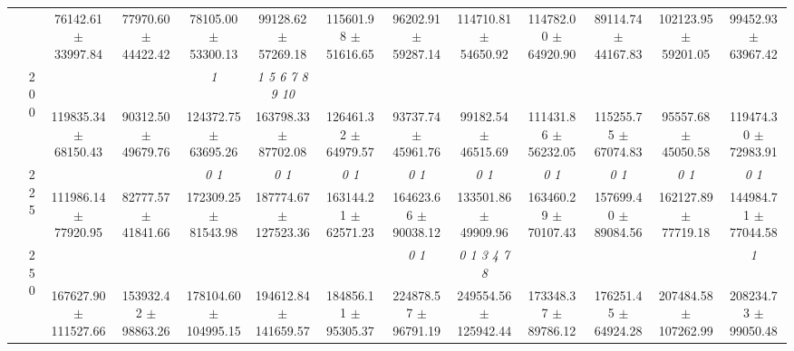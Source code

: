 \begin{table}[h]
{\begin{tabular}{
        ccccccccccccc}
 & & \cellcolor[HTML]{EFEFEF} 76142.61 $\pm$ 33997.84& \cellcolor[HTML]{EFEFEF} 77970.60 $\pm$ 44422.42& \cellcolor[HTML]{EFEFEF} 78105.00 $\pm$ 53300.13& \cellcolor[HTML]{EFEFEF} 99128.62 $\pm$ 57269.18& \cellcolor[HTML]{EFEFEF} 115601.98 $\pm$ 51616.65& \cellcolor[HTML]{EFEFEF} 96202.91 $\pm$ 59287.14& \cellcolor[HTML]{EFEFEF} 114710.81 $\pm$ 54650.92& \cellcolor[HTML]{EFEFEF} 114782.00 $\pm$ 64920.90& \cellcolor[HTML]{EFEFEF} 89114.74 $\pm$ 44167.83& \cellcolor[HTML]{EFEFEF} 102123.95 $\pm$ 59201.05& \cellcolor[HTML]{EFEFEF} 99452.93 $\pm$ 63967.42 \\ 
 & \multirow{2}{*}{200}& & & \textit{ 1 }& \textit{  1  5  6  7  8  9 10 }& & & & & & &  \\ 
 & & 119835.34 $\pm$ 68150.43& 90312.50 $\pm$ 49679.76& 124372.75 $\pm$ 63695.26& 163798.33 $\pm$ 87702.08& 126461.32 $\pm$ 64979.57& 93737.74 $\pm$ 45961.76& 99182.54 $\pm$ 46515.69& 111431.86 $\pm$ 56232.05& 115255.75 $\pm$ 67074.83& 95557.68 $\pm$ 45050.58& 119474.30 $\pm$ 72983.91 \\ 
 & \multirow{2}{*}{225}& \cellcolor[HTML]{EFEFEF} & \cellcolor[HTML]{EFEFEF} & \cellcolor[HTML]{EFEFEF} \textit{ 0 1 }& \cellcolor[HTML]{EFEFEF} \textit{ 0 1 }& \cellcolor[HTML]{EFEFEF} \textit{ 0 1 }& \cellcolor[HTML]{EFEFEF} \textit{ 0 1 }& \cellcolor[HTML]{EFEFEF} \textit{ 0 1 }& \cellcolor[HTML]{EFEFEF} \textit{ 0 1 }& \cellcolor[HTML]{EFEFEF} \textit{ 0 1 }& \cellcolor[HTML]{EFEFEF} \textit{ 0 1 }& \cellcolor[HTML]{EFEFEF} \textit{ 0 1 } \\ 
 & & \cellcolor[HTML]{EFEFEF} 111986.14 $\pm$ 77920.95& \cellcolor[HTML]{EFEFEF} 82777.57 $\pm$ 41841.66& \cellcolor[HTML]{EFEFEF} 172309.25 $\pm$ 81543.98& \cellcolor[HTML]{EFEFEF} 187774.67 $\pm$ 127523.36& \cellcolor[HTML]{EFEFEF} 163144.21 $\pm$ 62571.23& \cellcolor[HTML]{EFEFEF} 164623.66 $\pm$ 90038.12& \cellcolor[HTML]{EFEFEF} 133501.86 $\pm$ 49909.96& \cellcolor[HTML]{EFEFEF} 163460.29 $\pm$ 70107.43& \cellcolor[HTML]{EFEFEF} 157699.40 $\pm$ 89084.56& \cellcolor[HTML]{EFEFEF} 162127.89 $\pm$ 77719.18& \cellcolor[HTML]{EFEFEF} 144984.71 $\pm$ 77044.58 \\ 
 & \multirow{2}{*}{250}& & & & & & \textit{ 0 1 }& \textit{ 0 1 3 4 7 8 }& & & & \textit{ 1 } \\ 
 & & 167627.90 $\pm$ 111527.66& 153932.42 $\pm$ 98863.26& 178104.60 $\pm$ 104995.15& 194612.84 $\pm$ 141659.57& 184856.11 $\pm$ 95305.37& 224878.57 $\pm$ 96791.19& 249554.56 $\pm$ 125942.44& 173348.37 $\pm$ 89786.12& 176251.45 $\pm$ 64924.28& 207484.58 $\pm$ 107262.99& 208234.73 $\pm$ 99050.48 \\ 

\end{tabular}}
\end{table}
